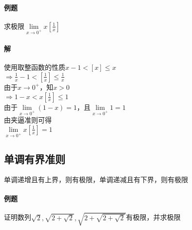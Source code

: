 \documentclass{article}
\begin{document}
\begin{flushleft}
	\paragraph{例题}
	求极限$\lim\limits_{x\to 0^+}x[\frac{1}{x}]$
	\paragraph{解}
	使用取整函数的性质$x-1<[x]\le x$\\
	$\Rightarrow \frac{1}{x}-1<[\frac{1}{x}]\le \frac{1}{x}$\\
	由于$x\to 0^+$，知$x>0$\\
	$\Rightarrow 1-x<x[\frac{1}{x}]\le 1$\\
	由于$\lim\limits_{x\to 0^+}(1-x)=1$，且$\lim\limits_{x\to 0^+}1=1$\\
	由夹逼准则可得\\
	$\lim\limits_{x\to 0^+}x[\frac{1}{x}]=1$\\
	
	\subsection{单调有界准则}
	单调递增且有上界，则有极限，单调递减且有下界，则有极限\\
	
	\paragraph{例题}
	证明数列$\sqrt{2}, \sqrt{2+\sqrt{2}}, \sqrt{2+\sqrt{2+\sqrt{2}}}$有极限，并求极限

\end{flushleft}
\end{document}
